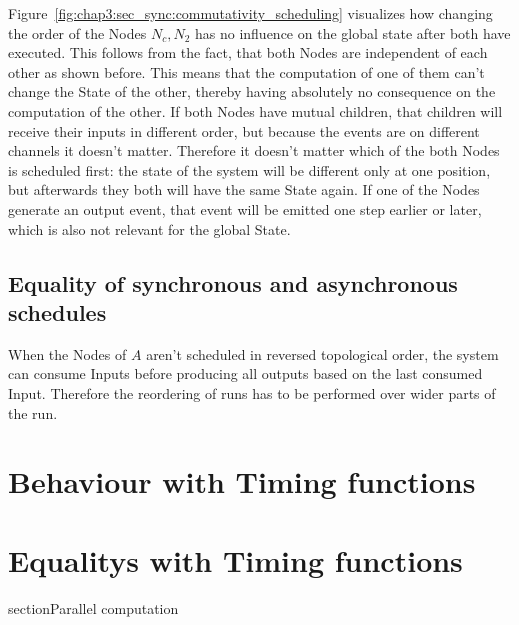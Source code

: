 Figure~\ref{fig:chap3:sec_sync:commutativity_scheduling} visualizes how changing the order of the Nodes \(N_c, N_2\) has no influence on the global state after both have executed.
This follows from the fact, that both Nodes are independent of each other as shown before.
This means that the computation of one of them can't change the State of the other, thereby having absolutely no consequence on the computation of the other.
If both Nodes have mutual children, that children will receive their inputs in different order, but because the events are  on different channels it doesn't matter.
Therefore it doesn't matter which of the both Nodes is scheduled first: the state of the system will be different only at one position, but afterwards they both will have the same State again.
If one of the Nodes generate an output event, that event will be emitted one step earlier or later, which is also not relevant for the global State.



\subsection{Equality of synchronous and asynchronous schedules}
\label{sec:concepts:equalitys_without_timing:sync_async}

When the Nodes of \(A\) aren't scheduled in reversed topological order, the system can consume Inputs before producing all outputs based on the last consumed Input.
Therefore the reordering of runs has to be performed over wider parts of the run.

\section{Behaviour with Timing functions}
\section{Equalitys with Timing functions}
section{Parallel computation}
